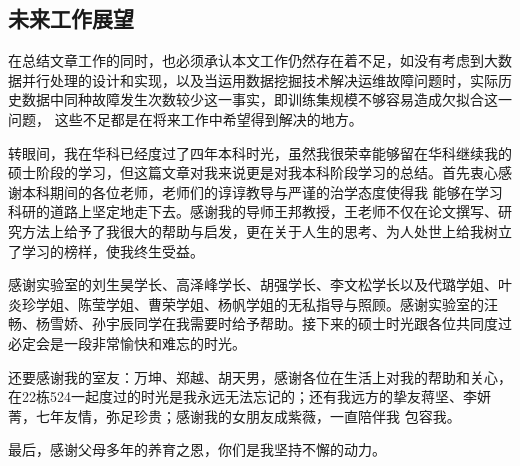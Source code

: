 \documentclass{HustGraduPaper}
\begin{document}
    \subsection{未来工作展望}
    在总结文章工作的同时，也必须承认本文工作仍然存在着不足，如没有考虑到大数据并行处理的设计和实现，以及当运用数据挖掘技术解决运维故障问题时，实际历史数据中同种故障发生次数较少这一事实，即训练集规模不够容易造成欠拟合这一问题，
    这些不足都是在将来工作中希望得到解决的地方。
    \begin{thankpage}
        转眼间，我在华科已经度过了四年本科时光，虽然我很荣幸能够留在华科继续我的硕士阶段的学习，但这篇文章对我来说更是对我本科阶段学习的总结。首先衷心感谢本科期间的各位老师，老师们的谆谆教导与严谨的治学态度使得我
        能够在学习科研的道路上坚定地走下去。感谢我的导师王邦教授，王老师不仅在论文撰写、研究方法上给予了我很大的帮助与启发，更在关于人生的思考、为人处世上给我树立了学习的榜样，使我终生受益。

        感谢实验室的刘生昊学长、高泽峰学长、胡强学长、李文松学长以及代璐学姐、叶炎珍学姐、陈莹学姐、曹荣学姐、杨帆学姐的无私指导与照顾。感谢实验室的汪畅、杨雪娇、孙宇辰同学在我需要时给予帮助。接下来的硕士时光跟各位共同度过
        必定会是一段非常愉快和难忘的时光。

        还要感谢我的室友：万坤、郑越、胡天男，感谢各位在生活上对我的帮助和关心，在22栋524一起度过的时光是我永远无法忘记的；还有我远方的挚友蒋坚、李妍菁，七年友情，弥足珍贵；感谢我的女朋友成紫薇，一直陪伴我
        包容我。

        最后，感谢父母多年的养育之恩，你们是我坚持不懈的动力。
	\end{thankpage}
    
    
\end{document}
